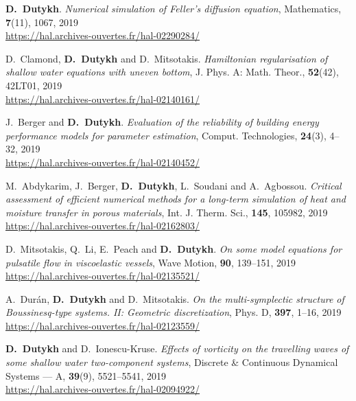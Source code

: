 \documentclass[final, a4paper, oneside, 12pt]{article}
\numberwithin{equation}{section}
\begin{document}
\begin{etaremune}
  \item \textbf{D.~Dutykh}. \textit{Numerical simulation of Feller's diffusion equation}, Mathematics, \textbf{7}(11), 1067, 2019 \\ %
  \url{https://hal.archives-ouvertes.fr/hal-02290284/}
  
  \item D.~Clamond, \textbf{D.~Dutykh} and D.~Mitsotakis. \textit{Hamiltonian regularisation of shallow water equations with uneven bottom}, J. Phys. A: Math. Theor., \textbf{52}(42), 42LT01, 2019 \\ %
  \url{https://hal.archives-ouvertes.fr/hal-02140161/}
  
  \item J.~Berger and \textbf{D.~Dutykh}. \textit{Evaluation of the reliability of building energy performance models for parameter estimation}, Comput. Technologies, \textbf{24}(3), 4--32, 2019 \\ %
  \url{https://hal.archives-ouvertes.fr/hal-02140452/}
  
  \item M.~Abdykarim, J.~Berger, \textbf{D.~Dutykh}, L.~Soudani and A.~Agbossou. \textit{Critical assessment of efficient numerical methods for a long-term simulation of heat and moisture transfer in porous materials}, Int. J. Therm. Sci., \textbf{145}, 105982, 2019 \\ %
  \url{https://hal.archives-ouvertes.fr/hal-02162803/}
  
  \item D.~Mitsotakis, Q.~Li, E.~Peach and \textbf{D.~Dutykh}. \textit{On some model equations for pulsatile flow in viscoelastic vessels}, Wave Motion, \textbf{90}, 139--151, 2019 \\ %
  \url{https://hal.archives-ouvertes.fr/hal-02135521/}
  
  \item A.~Dur\'{a}n, \textbf{D.~Dutykh} and D.~Mitsotakis. \textit{On the multi-symplectic structure of Boussinesq-type systems. II: Geometric discretization}, Phys. D, \textbf{397}, 1--16, 2019 \\ %
  \url{https://hal.archives-ouvertes.fr/hal-02123559/}
  
  \item \textbf{D.~Dutykh} and D.~Ionescu-Kruse. \textit{Effects of vorticity on the travelling waves of some shallow water two-component systems}, Discrete \& Continuous Dynamical Systems --- A, \textbf{39}(9), 5521--5541, 2019 \\ %
  \url{https://hal.archives-ouvertes.fr/hal-02094922/}
  

\end{etaremune}
\end{document}
